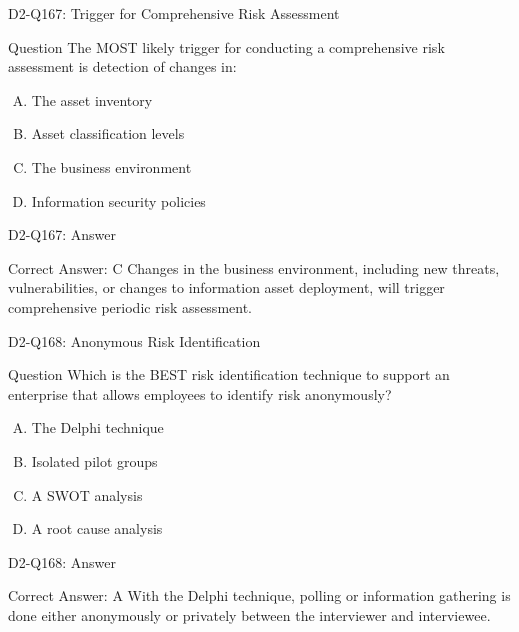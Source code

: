 \documentclass{beamer}
\begin{document}
	\begin{frame}{D2-Q167: Trigger for Comprehensive Risk Assessment}
		\begin{block}{Question}
			The MOST likely trigger for conducting a comprehensive risk assessment is detection of changes in:
		\end{block}
		\begin{enumerate}[(A)]
			\item The asset inventory
			\item Asset classification levels
			\item The business environment
			\item Information security policies
		\end{enumerate}
	\end{frame}
	\begin{frame}{D2-Q167: Answer}
		\begin{block}{Correct Answer: C}
			Changes in the business environment, including new threats, vulnerabilities, or changes to information asset deployment, will trigger comprehensive periodic risk assessment.
		\end{block}
	\end{frame}
	
	\begin{frame}{D2-Q168: Anonymous Risk Identification}
		\begin{block}{Question}
			Which is the BEST risk identification technique to support an enterprise that allows employees to identify risk anonymously?
		\end{block}
		\begin{enumerate}[(A)]
			\item The Delphi technique
			\item Isolated pilot groups
			\item A SWOT analysis
			\item A root cause analysis
		\end{enumerate}
	\end{frame}
	\begin{frame}{D2-Q168: Answer}
		\begin{block}{Correct Answer: A}
			With the Delphi technique, polling or information gathering is done either anonymously or privately between the interviewer and interviewee.
		\end{block}
	\end{frame}
	
\end{document}
